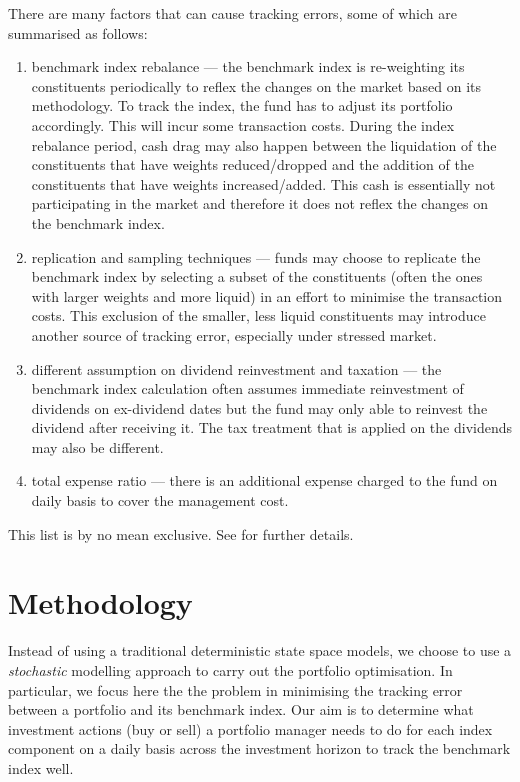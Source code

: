 There are many factors that can cause tracking errors, some of which are summarised as follows:
\begin{enumerate}
\item benchmark index rebalance --- the benchmark index is re-weighting its constituents periodically to reflex the changes on the market based on its methodology. To track the index, the fund has to adjust its portfolio accordingly. This will incur some transaction costs. During the index rebalance period, cash drag may also  happen between the liquidation of the constituents that have weights reduced/dropped and the addition of the constituents that have weights increased/added. This cash is essentially not participating in the market and therefore it does not reflex the changes on the benchmark index.
\item replication and sampling techniques --- funds may choose to replicate the benchmark index by selecting a subset of the constituents (often the ones with larger weights and more liquid) in an effort to minimise the transaction costs. This exclusion of the smaller, less liquid constituents may introduce another source of tracking error, especially under stressed market.
\item different assumption on dividend reinvestment and taxation --- the benchmark index calculation often assumes immediate reinvestment of dividends on ex-dividend dates but the fund may only able to reinvest the dividend after receiving it. The tax treatment that is applied on the dividends may also be different.
\item total expense ratio --- there is an additional expense charged to the fund on daily basis to cover the management cost.
\end{enumerate}
This list is by no mean exclusive. See \cite{BJ13} for further details.
 
\section{Methodology}
Instead of using a traditional deterministic state space models, we choose to use a \emph{stochastic} modelling approach to carry out the portfolio optimisation. In particular, we focus here the the problem in minimising the tracking error between a portfolio and its benchmark index.  Our aim is to determine what investment actions (buy or sell) a portfolio manager needs to do for each index component on a daily basis across the investment horizon to track the benchmark index well.

